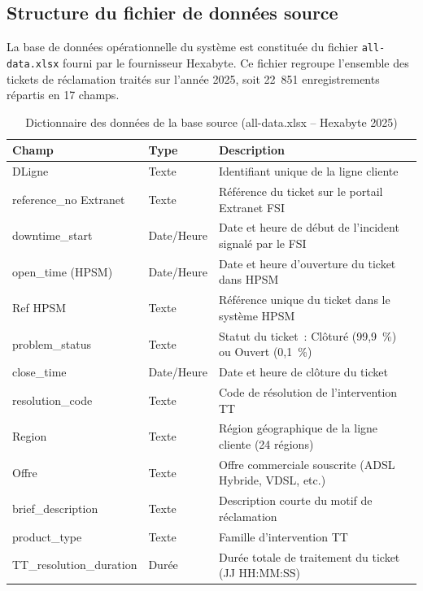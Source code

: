 \documentclass[11pt,a4paper]{report}
\begin{document}
\subsection{Structure du fichier de données source}

La base de données opérationnelle du système est constituée du fichier \texttt{all-data.xlsx} fourni par le fournisseur Hexabyte. Ce fichier regroupe l'ensemble des tickets de réclamation traités sur l'année 2025, soit 22~851 enregistrements répartis en 17 champs.

\begin{table}[h!]
\centering
\caption{Dictionnaire des données de la base source (all-data.xlsx -- Hexabyte 2025)}
\begin{tabularx}{\textwidth}{L{4cm} L{2.5cm} X}
\toprule
\textbf{Champ} & \textbf{Type} & \textbf{Description} \\
\midrule
DLigne                  & Texte      & Identifiant unique de la ligne cliente \\
reference\_no Extranet  & Texte      & Référence du ticket sur le portail Extranet FSI \\
downtime\_start         & Date/Heure & Date et heure de début de l'incident signalé par le FSI \\
open\_time (HPSM)       & Date/Heure & Date et heure d'ouverture du ticket dans HPSM \\
Ref HPSM                & Texte      & Référence unique du ticket dans le système HPSM \\
problem\_status         & Texte      & Statut du ticket~: Clôturé (99,9~\%) ou Ouvert (0,1~\%) \\
close\_time             & Date/Heure & Date et heure de clôture du ticket \\
resolution\_code        & Texte      & Code de résolution de l'intervention TT \\
Region                  & Texte      & Région géographique de la ligne cliente (24 régions) \\
Offre                   & Texte      & Offre commerciale souscrite (ADSL Hybride, VDSL, etc.) \\
brief\_description      & Texte      & Description courte du motif de réclamation \\
product\_type           & Texte      & Famille d'intervention TT \\
TT\_resolution\_duration & Durée    & Durée totale de traitement du ticket (JJ HH:MM:SS) \\
\bottomrule
\end{tabularx}
\label{tab:dict}
\end{table}
\end{document}
